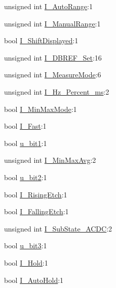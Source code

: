 \begin{DoxyCompactItemize}
unsigned int \hyperlink{structFluke_1_1Fluke189_1_1qdInfo__t_a70bb64e7e52b6b8fdb584878f9ef4b2a}{I\_\-AutoRange}:1
\item 
unsigned int \hyperlink{structFluke_1_1Fluke189_1_1qdInfo__t_ac7769eec0ce6e6ec1eaf88c1736e51c0}{I\_\-ManualRange}:1
\item 
bool \hyperlink{structFluke_1_1Fluke189_1_1qdInfo__t_ac17c2f1b6bafd6e9559805f1d31e9317}{I\_\-ShiftDisplayed}:1
\item 
unsigned int \hyperlink{structFluke_1_1Fluke189_1_1qdInfo__t_ae4c25629fcefa361ba142764eb5bffdf}{I\_\-DBREF\_\-Set}:16
\item 
unsigned int \hyperlink{structFluke_1_1Fluke189_1_1qdInfo__t_a9ecea1a82c8e2cd052fd255bebbc6242}{I\_\-MeasureMode}:6
\item 
unsigned int \hyperlink{structFluke_1_1Fluke189_1_1qdInfo__t_a3e563ee447402d71b5ad1f6da7c1f876}{I\_\-Hz\_\-Percent\_\-ms}:2
\item 
bool \hyperlink{structFluke_1_1Fluke189_1_1qdInfo__t_a5d59e161cce6a005a7b0e0443abdc01e}{I\_\-MinMaxMode}:1
\item 
bool \hyperlink{structFluke_1_1Fluke189_1_1qdInfo__t_a6be3b9b1cf4f648315f5904487fe3e48}{I\_\-Fast}:1
\item 
bool \hyperlink{structFluke_1_1Fluke189_1_1qdInfo__t_a49bb210666c03813d3e2dd5e7739c97f}{u\_\-bit1}:1
\item 
unsigned int \hyperlink{structFluke_1_1Fluke189_1_1qdInfo__t_ae906425b9f885f10a8eacee025cd969c}{I\_\-MinMaxAvg}:2
\item 
bool \hyperlink{structFluke_1_1Fluke189_1_1qdInfo__t_a3ee66a3c3b07169f2470fc7b8d832601}{u\_\-bit2}:1
\item 
bool \hyperlink{structFluke_1_1Fluke189_1_1qdInfo__t_a5006422f02c22ab8a426d6c983f0bc58}{I\_\-RisingEtch}:1
\item 
bool \hyperlink{structFluke_1_1Fluke189_1_1qdInfo__t_a9d83990a6827723f7a5af68630f71d6a}{I\_\-FallingEtch}:1
\item 
unsigned int \hyperlink{structFluke_1_1Fluke189_1_1qdInfo__t_ad470066c524793dc47a3dcb23618c49a}{I\_\-SubState\_\-ACDC}:2
\item 
bool \hyperlink{structFluke_1_1Fluke189_1_1qdInfo__t_a1989b018d05ed21b310846a8cba4099e}{u\_\-bit3}:1
\item 
bool \hyperlink{structFluke_1_1Fluke189_1_1qdInfo__t_af6144c8481ee484c798ea68a5c290689}{I\_\-Hold}:1
\item 
bool \hyperlink{structFluke_1_1Fluke189_1_1qdInfo__t_ac3847dd0cc0cf882a6ceefb14234ee81}{I\_\-AutoHold}:1

\end{DoxyCompactItemize}
